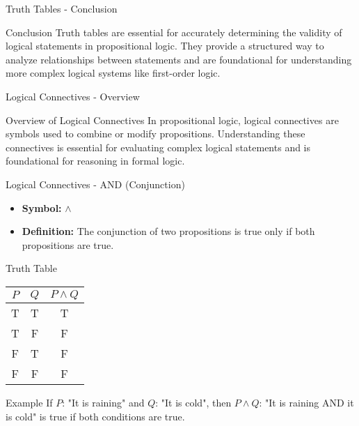 \documentclass[aspectratio=169]{beamer}
\begin{document}
\begin{frame}[fragile]{Truth Tables - Conclusion}
    \begin{block}{Conclusion}
        Truth tables are essential for accurately determining the validity of logical statements in propositional logic. They provide a structured way to analyze relationships between statements and are foundational for understanding more complex logical systems like first-order logic.
    \end{block}
\end{frame}

\begin{frame}[fragile]{Logical Connectives - Overview}
    \begin{block}{Overview of Logical Connectives}
        In propositional logic, logical connectives are symbols used to combine or modify propositions. Understanding these connectives is essential for evaluating complex logical statements and is foundational for reasoning in formal logic.
    \end{block}
\end{frame}

\begin{frame}[fragile]{Logical Connectives - AND (Conjunction)}
    \begin{itemize}
        \item \textbf{Symbol:} $\land$
        \item \textbf{Definition:} The conjunction of two propositions is true only if both propositions are true.
    \end{itemize}
    \begin{block}{Truth Table}
        \begin{tabular}{|c|c|c|}
            \hline
            $P$ & $Q$ & $P \land Q$ \\
            \hline
            T & T & T \\
            T & F & F \\
            F & T & F \\
            F & F & F \\
            \hline
        \end{tabular}
    \end{block}
    \begin{block}{Example}
        If $P$: "It is raining" and $Q$: "It is cold", then $P \land Q$: "It is raining AND it is cold" is true if both conditions are true.
    \end{block}
\end{frame}
\end{document}
